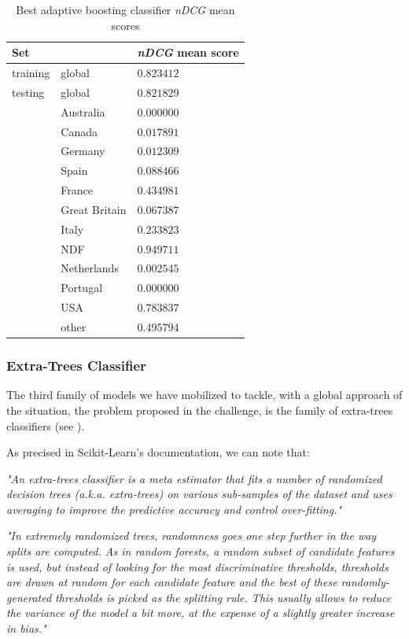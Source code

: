 \documentclass[twocolumn, switch]{article}
\begin{document}
\begin{table}[H]
\caption{Best adaptive boosting classifier \textit{nDCG} mean scores}
\centering
\begin{tabular}{lll}
\toprule
Set & & \textit{nDCG} mean score \\
\midrule
training & global & $0.823412$ \\
testing & global & $0.821829$ \\
& Australia & $0.000000$ \\
& Canada & $0.017891$ \\
& Germany & $0.012309$ \\
& Spain & $0.088466$ \\
& France & $0.434981$ \\
& Great Britain & $0.067387$ \\
& Italy & $0.233823$ \\
& NDF & $0.949711$ \\
& Netherlands & $0.002545$ \\
& Portugal & $0.000000$ \\
& USA & $0.783837$ \\
& other & $0.495794$ \\
\bottomrule
\end{tabular}
\label{tab:abc}
\end{table}

\subsubsection{Extra-Trees Classifier}

The third family of models we have mobilized to tackle, with a global approach of the situation, the problem proposed in the challenge, is the family of extra-trees classifiers (see \cite{Geurts_2006}).

As precised in Scikit-Learn's documentation, we can note that:

\textit{"An extra-trees classifier is a meta estimator that fits a number of randomized decision trees (a.k.a. extra-trees) on various sub-samples of the dataset and uses averaging to improve the predictive accuracy and control over-fitting."}

\textit{"In extremely randomized trees, randomness goes one step further in the way splits are computed. As in random forests, a random subset of candidate features is used, but instead of looking for the most discriminative thresholds, thresholds are drawn at random for each candidate feature and the best of these randomly-generated thresholds is picked as the splitting rule. This usually allows to reduce the variance of the model a bit more, at the expense of a slightly greater increase in bias."}
\end{document}
